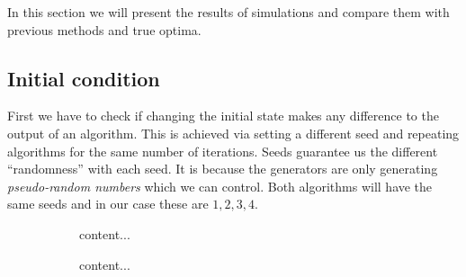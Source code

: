 In this section we will present the results of simulations and compare them with previous methods and true optima.

\subsection{Initial condition}
	First we have to check if changing the initial state makes any difference to the output of an algorithm. This is achieved via setting a different seed and repeating algorithms for the same number of iterations. Seeds guarantee us the different ``randomness'' with each seed. It is because the generators are only generating \textit{pseudo-random numbers} which we can control. Both algorithms will have the same seeds and in our case these are $1,2,3,4$.
	\begin{figure}[!htb]
		\begin{subfigure}{0.45\textwidth}
			content...
		\end{subfigure}
		\begin{subfigure}{0.45\textwidth}
			content...
		\end{subfigure}
	\end{figure}